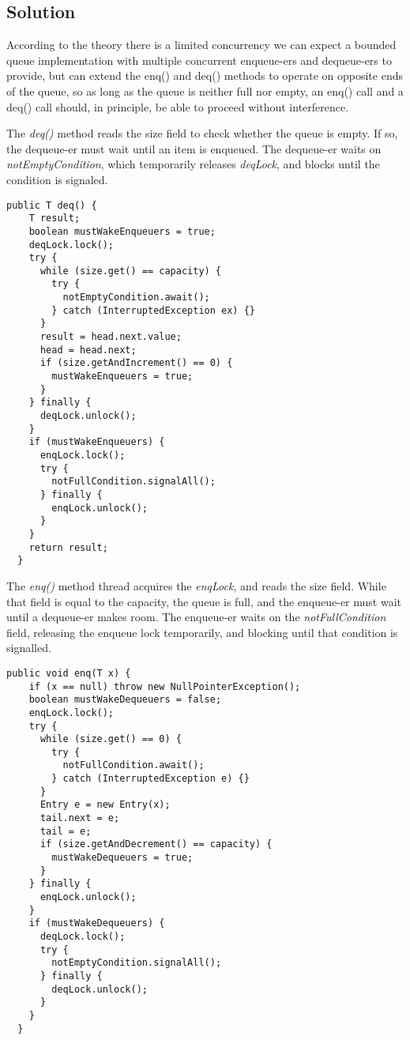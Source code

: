 \subsection{Solution}
\par
According to the theory there is a limited concurrency we can expect a bounded queue implementation with multiple concurrent enqueue-ers and dequeue-ers to provide, but can extend the enq() and deq() methods to operate on opposite ends of the queue, so as long as the queue is neither full nor empty, an enq() call and a deq() call should, in principle, be able to proceed without interference.
\par
The \textit{deq()} method reads the size field to check whether the queue is empty. If so, the dequeue-er must wait until an item is enqueued. The dequeue-er waits on \textit{notEmptyCondition}, which temporarily releases \textit{deqLock}, and blocks until the condition is signaled. 
\par
\begin{lstlisting}[frame=single,breaklines=true]
  public T deq() {
    T result;
    boolean mustWakeEnqueuers = true;
    deqLock.lock();
    try {
      while (size.get() == capacity) {
        try {
          notEmptyCondition.await();
        } catch (InterruptedException ex) {}
      }
      result = head.next.value;
      head = head.next;
      if (size.getAndIncrement() == 0) {
        mustWakeEnqueuers = true;
      }
    } finally {
      deqLock.unlock();
    }
    if (mustWakeEnqueuers) {
      enqLock.lock();
      try {
        notFullCondition.signalAll();
      } finally {
        enqLock.unlock();
      }
    }
    return result;
  }
\end{lstlisting}
\par
The \textit{enq()} method thread acquires the \textit{enqLock}, and reads the size field. While that field is equal to the capacity, the queue is full, and the enqueue-er must wait until a dequeue-er makes room. The enqueue-er waits on the \textit{notFullCondition} field, releasing the enqueue lock temporarily, and blocking until that condition is signalled.
\par 
\begin{lstlisting}[frame=single,breaklines=true]
  public void enq(T x) {
    if (x == null) throw new NullPointerException();
    boolean mustWakeDequeuers = false;
    enqLock.lock();
    try {
      while (size.get() == 0) {
        try {
          notFullCondition.await();
        } catch (InterruptedException e) {}
      }
      Entry e = new Entry(x);
      tail.next = e;
      tail = e;
      if (size.getAndDecrement() == capacity) {
        mustWakeDequeuers = true;
      }
    } finally {
      enqLock.unlock();
    }
    if (mustWakeDequeuers) {
      deqLock.lock();
      try {
        notEmptyCondition.signalAll();
      } finally {
        deqLock.unlock();
      }
    }
  }
\end{lstlisting}

